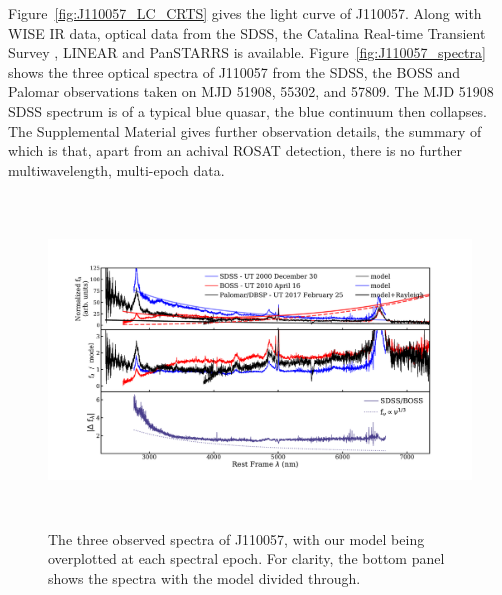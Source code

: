 \documentclass{nature}
\begin{document}
Figure~\ref{fig:J110057_LC_CRTS} gives the light curve of J110057.
Along with WISE IR data, optical data from the SDSS, the Catalina
Real-time Transient Survey \citep[CRTS;][]{Drake2009, Mahabal2011},
LINEAR \citep{Sesar2011} and PanSTARRS \citep{Kaiser2010, Stubbs2010,
Tonry2012, Magnier2013} is available.
Figure~\ref{fig:J110057_spectra} shows the three optical spectra of
J110057 from the SDSS, the BOSS and Palomar observations taken on MJD
51908, 55302, and 57809. The MJD 51908 SDSS spectrum is of a typical
blue quasar, the blue continuum then collapses.  The Supplemental
Material gives further observation details, the summary of which is that, 
apart from an achival ROSAT detection, there is no further
multiwavelength, multi-epoch data.



\begin{figure}
  \includegraphics[width=15.4cm, height=8.75cm, trim=0.0cm 0.0cm 0.0cm 0.0cm, clip]
  {../plots/models/mcd_gap_v3_20171017v1.pdf}
  \centering
  \caption[]{The three observed spectra of J110057, with our model
    being overplotted at each spectral epoch. For clarity, the bottom
    panel shows the spectra with the model divided through. }
  \label{fig:J110057_diskmodel}
\end{figure}
\end{document}
